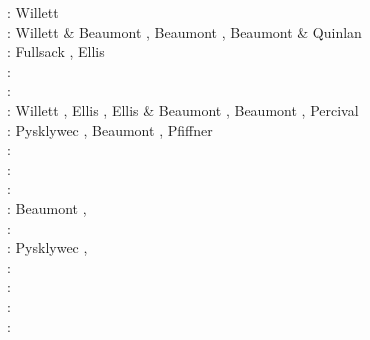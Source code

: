 \begin{itemize}
\begin{scriptsize}
\nineteenninetythree: Willett \etal \cite{wibf93}\\
\nineteenninetyfour: Willett \& Beaumont \cite{wibe94}, Beaumont \etal \cite{befh94},
                     Beaumont \& Quinlan \cite{bequ94}\\
\nineteenninetyfive: Fullsack \cite{full95}, Ellis \etal \cite{elfb95}\\
\nineteenninetysix: \cite{bekh96}\cite{beeh96}\cite{wabe96}\\
\nineteenninetyeight: \cite{elbj98}\cite{jabf98}\cite{wabb98}\\
\nineteenninetynine: Willett \cite{will99a,will99b}, Ellis \etal \cite{elbp99},
                     Ellis \& Beaumont \cite{elbe99}, Beaumont \etal \cite{beep99},
                     Percival \etal \cite{pelj99}\\
\twothousand: Pysklywec \etal \cite{pybf00}, Beaumont \etal \cite{bemh00},
              Pfiffner \etal \cite{pfeb00}\\
\twothousandone: \cite{bejn01}\\
\twothousandtwo: \cite{hube02}\cite{pybf02}\\
\twothousandthree: \cite{hube03}\cite{vamf03}
                   \cite{wipo03}\cite{pymi03}
                   \cite{bupf03}\cite{wiep03}\\
\twothousandfour: Beaumont \etal \cite{bejn04}, \cite{pycr04}
                  \cite{pybe04}\cite{elsp04}
                  \cite{geim04}\cite{jabm04}\\
\twothousandfive: \cite{gebi05}\cite{hubb05}\\
\twothousandsix: Pysklywec \etal \cite{pysk06}, \cite{selz06}
                 \cite{pabs06}\cite{jabn06}
                 \cite{benj06}\cite{cubj06}
                 \cite{crnp06}\\
\twothousandseven: \cite{hube07}\cite{cubh07}
                   \cite{mohb07}\cite{sebp07}
                   \cite{buto07b}\cite{jabn07}\cite{shpy07}\\
\twothousandeight: \cite{sebp08}\cite{wabj08}
                   \cite{wabj08b}\cite{gopy08}
                   \cite{buhb08}\cite{hube08}\cite{cuhb08}\\
\twothousandnine: \cite{kecw09}\cite{bejb09}
                  \cite{bupb09}\cite{grba09}\cite{sihb09}\\
\twothousandten: \cite{albs10}\cite{albe10}
                 \cite{grpy10}\cite{pygp10}
                 \cite{albi10}\cite{jabw10}
                 \cite{inbe10}\cite{inbe10b}\\

\end{scriptsize}
\end{itemize}
